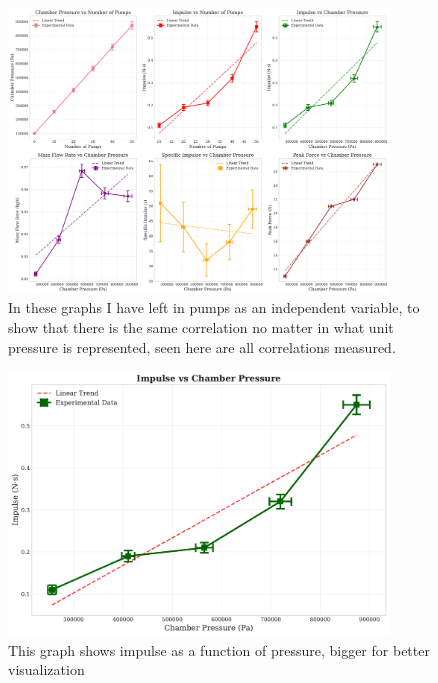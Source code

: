 \documentclass[12pt,a4paper]{article}
\begin{document}
\begin{figure}[H]
\centering
\includegraphics[width=0.9\textwidth]{physics_ia_comprehensive_analysis.pdf}
 \caption{In these graphs I have left in pumps as an independent variable, to show that there is the same correlation no matter in what unit pressure is represented, seen here are all correlations measured.}
\label{fig:comprehensive_analysis}
\end{figure}

\begin{figure}[H]
\centering
\includegraphics[width=0.9\textwidth]{impulse_vs_pressure.pdf}
    \caption{This graph shows impulse as a function of pressure, bigger for better visualization}
\label{fig:impulse_pressure}
\end{figure}
\end{document}
